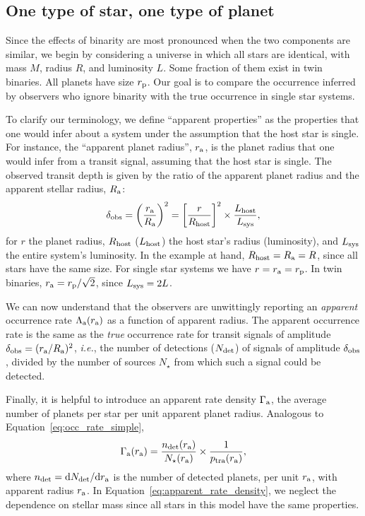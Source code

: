 \documentclass[12pt,modern]{aastex61}
\renewcommand{\a}{_{\rm a}}
\newcommand{\p}{_{\rm p}}
\begin{document}
\subsection{One type of star, one type of planet}
\label{sec:model_1}

Since the effects of binarity are most pronounced when the two
components are similar, we begin by considering a universe in which
all stars are identical, with mass $M$, radius $R$, and luminosity
$L$.  Some fraction of them exist in twin binaries.
All planets have size $r\p$.
Our goal is to compare the occurrence inferred by observers who
ignore binarity with the true occurrence in single star systems.

To clarify our terminology, we define ``apparent properties'' as the 
properties that one would infer about a system under the assumption that the 
host star is single. For instance, the  ``apparent planet radius'', $r\a$, is
the planet radius that one would infer from a transit signal, 
assuming that the host star is single.
The observed transit depth is given by the ratio of the apparent planet
radius and the apparent stellar radius, $R\a$:
\begin{equation}
\delta_{\rm obs}
= \left(\frac{r\a}{R\a}\right)^2
= \left[{r\over R_{\rm host}}\right]^2\times {L_{\rm host} \over L_{\rm 
        sys}},
\label{eq:delta_obs_general} 
\end{equation}
for $r$ the planet radius, $R_{\rm host}$ ($L_{\rm host}$) the 
host star's radius (luminosity), and $L_{\rm sys}$ the 
entire system's luminosity.
In the example at hand, $R_{\rm host} =R\a = R$, since all stars have the same 
size. For single star systems we have $r=r\a=r\p$. In twin binaries, 
$r\a=r\p/\sqrt{2}$, since $L_{\rm sys}=2L$.

We can now understand that the observers are unwittingly
reporting an {\it apparent} occurrence rate $\Lambda\a(r\a)$ as
a function of apparent radius.
The apparent occurrence rate is the same as the {\it true} occurrence rate for 
transit signals of 
amplitude $\delta_{\rm obs} = (r\a/R\a)^2$, \textit{i.e.}, the number of 
detections ($N_{\rm det}$) of signals of amplitude $\delta_{\rm obs}$, divided 
by the number of sources $N_\star$ from which such a signal could be detected.

Finally, it is helpful to introduce an apparent rate density 
$\Gamma\a$, the average number of planets per star per unit apparent planet 
radius. Analogous to Equation~\ref{eq:occ_rate_simple},  
\begin{equation}
\Gamma\a(r\a) = \frac{n_{\rm det}(r\a)}{N_\star(r\a)}
\times \frac{1}{p_{\rm tra}(r\a)},
\label{eq:apparent_rate_density}
\end{equation}
where $n_{\rm det}={\rm d}N_{\rm det}/{\rm d}r\a$ is the number  
of detected planets, per unit $r\a$, with apparent radius $r\a$.
In Equation~\ref{eq:apparent_rate_density}, we neglect the dependence on 
stellar mass since all stars in this model have the same properties.
\end{document}
